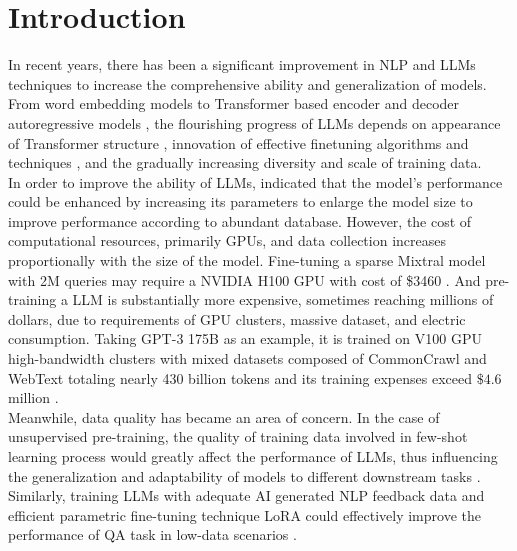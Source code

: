 \documentclass[10pt]{article}
\begin{document}
\section{Introduction}\label{sec:1}
In recent years, there has been a significant improvement in NLP and LLMs techniques to increase the comprehensive ability and generalization of models. From word embedding models  
 \cite{Mikolov2013EfficientEO,Pennington2014GloVeGV} to Transformer based encoder and decoder autoregressive models  
  \cite{devlin2019bertpretrainingdeepbidirectional, Raffel2019ExploringTL, Brown2020LanguageMA, Chowdhery2022PaLMSL, touvron2023llamaopenefficientfoundation, Touvron2023Llama2O}, the flourishing progress of LLMs depends on appearance of Transformer structure \cite{Vaswani2017AttentionIA}, innovation of effective finetuning algorithms and techniques \cite{Kwon2023EfficientMM,Dao2022FlashAttentionFA,Hu2021LoRALA,Dettmers2023QLoRAEF}, and the gradually increasing diversity and scale of training data.\\ 

In order to improve the ability of LLMs, \cite{kaplan2020scalinglawsneurallanguage} indicated that the model's performance could be enhanced by increasing its parameters to enlarge the model size to improve performance according to abundant database. However, the cost of computational resources, primarily GPUs, and data collection increases proportionally with the size of the model. Fine-tuning a sparse Mixtral model with 2M queries may require a NVIDIA H100 GPU with cost of \$3460 \cite{xia2024understandingperformanceestimatingcost}. And pre-training a LLM is substantially more expensive, sometimes reaching millions of dollars, due to requirements of GPU clusters, massive dataset, and electric consumption. Taking GPT-3 175B \cite{Brown2020LanguageMA} as an example, it is trained on V100 GPU high-bandwidth clusters with mixed datasets composed of CommonCrawl \cite{Raffel2019ExploringTL} and WebText \cite{radford2019language} totaling nearly 430 billion tokens and its training expenses exceed $\$4.6$ million \cite{lambda_demystifying_gpt3}.\\

Meanwhile, data quality has became an area of concern. In the case of unsupervised pre-training, the quality of training data involved in few-shot learning process would greatly affect the performance of LLMs, thus influencing the generalization and adaptability of models to different downstream tasks \cite{Brown2020LanguageMA}. Similarly, training LLMs with adequate AI generated NLP feedback data and efficient parametric fine-tuning technique LoRA \cite{Hu2021LoRALA} could effectively improve the performance of QA task in low-data scenarios \cite{li2023laffileveraginghybridnatural}. \\
\end{document}
